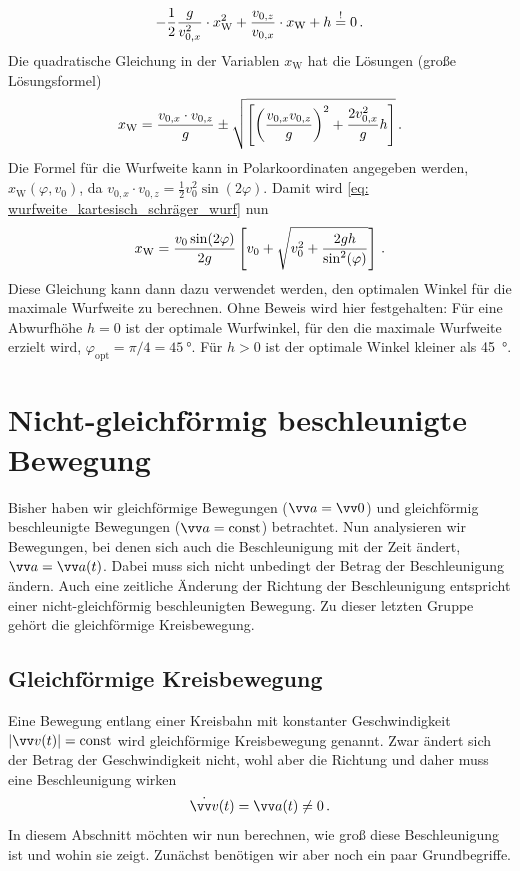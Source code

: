 \begin{equation}
    - \frac{1}{2} \frac{g}{v_{0,x}^2} \cdot x_\mathrm{W}^2 + \frac{v_{0,z}}{v_{0,x}} \cdot x_\mathrm{W} + h \stackrel{!}{=} 0 \,.
\end{equation}
Die quadratische Gleichung in der Variablen $x_\mathrm{W}$ hat die Lösungen (große Lösungsformel)
\begin{equation}\label{eq: wurfweite_kartesisch_schräger_wurf}
    x_\mathrm{W} = \frac{v_{0,x}\cdot v_{0,z}}{g} \pm \sqrt{\left[ {\left( \frac{v_{0,x} v_{0,z}}{g}\right)}^2 + \frac{2 v_{0,x}^2}{g}h \right]} \,.
\end{equation}
Die Formel für die Wurfweite kann in Polarkoordinaten angegeben werden, \gDh $x_\mathrm{W}(\varphi, v_0)$, da $v_{0,x}\cdot v_{0,z} = \frac{1}{2}v_0^2 \sin(2\varphi)$. Damit wird \cref{eq: wurfweite_kartesisch_schräger_wurf} nun 
\begin{equation}\label{eq: wurfweite_polar_schräger_wurf}
    x_\mathrm{W} = \frac{v_{0}\sin(2\varphi)}{2g} \left[ v_0 + \sqrt{v_0^2 + \frac{2gh}{\sin^2(\varphi)}} \right] \,.
\end{equation}
Diese Gleichung kann dann dazu verwendet werden, den optimalen Winkel für die maximale Wurfweite zu berechnen. Ohne Beweis wird hier festgehalten: Für eine Abwurfhöhe $h = 0$ ist der optimale Wurfwinkel, für den die maximale Wurfweite erzielt wird, $\varphi_{\mathrm{opt}} = \pi/4 = \SI{45}{\degree}$. Für $h > 0$ ist der optimale Winkel kleiner als \SI{45}{\degree}.

\section{Nicht-gleichförmig beschleunigte Bewegung}
Bisher haben wir gleichförmige Bewegungen ($\ivec{a} = \ivec{0}$) und gleichförmig beschleunigte Bewegungen ($\ivec{a} = \const$) betrachtet. Nun analysieren wir Bewegungen, bei denen sich auch die Beschleunigung mit der Zeit ändert, \gDh $\ivec{a} = \ivec{a}(t)$. Dabei muss sich nicht unbedingt der Betrag der Beschleunigung ändern. Auch eine zeitliche Änderung der Richtung der Beschleunigung entspricht einer nicht-gleichförmig beschleunigten Bewegung. Zu dieser letzten Gruppe gehört die gleichförmige Kreisbewegung. 
\subsection{Gleichförmige Kreisbewegung}
Eine Bewegung entlang einer Kreisbahn mit konstanter Geschwindigkeit $|\ivec{v}(t)| = \const$ wird gleichförmige Kreisbewegung genannt. Zwar ändert sich der Betrag der Geschwindigkeit nicht, wohl aber die Richtung und daher muss eine Beschleunigung wirken
\begin{equation}
    \dot{\ivec{v}}(t) = \ivec{a}(t) \neq 0 \mDot
\end{equation}
In diesem Abschnitt möchten wir nun berechnen, wie groß diese Beschleunigung ist und wohin sie zeigt. Zunächst benötigen wir aber noch ein paar Grundbegriffe.

